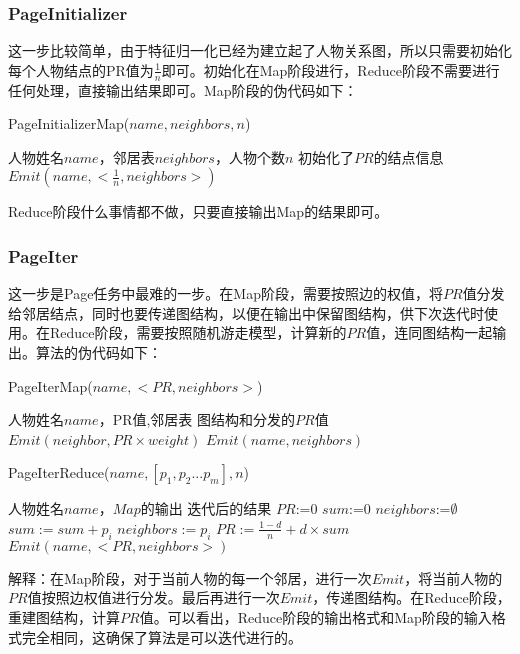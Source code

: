 \subsubsection{PageInitializer}
这一步比较简单，由于特征归一化已经为建立起了人物关系图，所以只需要初始化每个人物结点的PR值为$\frac{1}{n}$即可。初始化在Map阶段进行，Reduce阶段不需要进行任何处理，直接输出结果即可。Map阶段的伪代码如下：
\begin{algorithm}[H]
	\caption{PageInitializerMap($name,neighbors,n$)}
	\begin{algorithmic}[1]
		\REQUIRE 人物姓名$name$，邻居表$neighbors$，人物个数$n$
		\ENSURE 初始化了$PR$的结点信息
		\STATE $Emit(name, <\frac{1}{n}, neighbors>)$
	\end{algorithmic}
\end{algorithm}
Reduce阶段什么事情都不做，只要直接输出Map的结果即可。

\subsubsection{PageIter}
这一步是Page任务中最难的一步。在Map阶段，需要按照边的权值，将$PR$值分发给邻居结点，同时也要传递图结构，以便在输出中保留图结构，供下次迭代时使用。在Reduce阶段，需要按照随机游走模型，计算新的$PR$值，连同图结构一起输出。算法的伪代码如下：
\begin{algorithm}[H]
	\caption{PageIterMap($name,<PR,neighbors>$)}
	\begin{algorithmic}[1]
		\REQUIRE 人物姓名$name$，PR值,邻居表
		\ENSURE 图结构和分发的$PR$值
		\STATE $Emit(neighbor, PR\times weight)$
		\ENDFOR
		\STATE $Emit(name, neighbors)$
	\end{algorithmic}
\end{algorithm}

\begin{algorithm}[H]
	\caption{PageIterReduce($name,[p_1,p_2...p_m],n$)}
	\begin{algorithmic}[1]
		\REQUIRE 人物姓名$name$，$Map$的输出
		\ENSURE 迭代后的结果
		\STATE $PR$:=0
		\STATE $sum$:=0
		\STATE $neighbors$:=$\emptyset$
		\STATE $sum := sum + p_i$
		\ELSE
		\STATE $neighbors:=p_i$
		\ENDIF
		\ENDFOR
		\STATE $PR:= \frac{1-d}{n} + d \times sum$
		\STATE $Emit(name, <PR, neighbors>)$
	\end{algorithmic}
\end{algorithm}
解释：在Map阶段，对于当前人物的每一个邻居，进行一次$Emit$，将当前人物的$PR$值按照边权值进行分发。最后再进行一次$Emit$，传递图结构。在Reduce阶段，重建图结构，计算$PR$值。可以看出，Reduce阶段的输出格式和Map阶段的输入格式完全相同，这确保了算法是可以迭代进行的。

